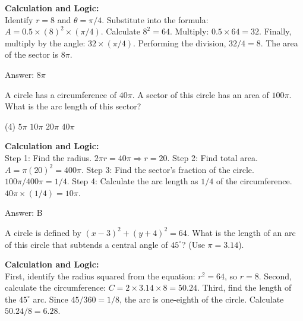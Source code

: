 \documentclass[11pt,paper=a4,answers]{exam}
\begin{document}
\begin{questions}
\begin{solution}
\textbf{Calculation and Logic:} \\
Identify $r = 8$ and $\theta = \pi / 4$. Substitute into the formula: $A = 0.5 \times (8)^2 \times (\pi / 4)$. Calculate $8^2 = 64$. Multiply: $0.5 \times 64 = 32$. Finally, multiply by the angle: $32 \times (\pi / 4)$. Performing the division, $32 / 4 = 8$. The area of the sector is $8\pi$.

\vspace{30pt}

Answer: \colorbox{yellow!100}{$8\pi$}
\end{solution}

\vspace{60pt}

\question
A circle has a circumference of $40\pi$. A sector of this circle has an area of $100\pi$. What is the arc length of this sector?
\begin{tasks}(4)
    \task $5\pi$
    \task $10\pi$
    \task $20\pi$
    \task $40\pi$
\end{tasks}

\begin{solution}
\textbf{Calculation and Logic:} \\
Step 1: Find the radius. $2\pi r = 40\pi \Rightarrow r = 20$. Step 2: Find total area. $A = \pi(20)^2 = 400\pi$. Step 3: Find the sector's fraction of the circle. $100\pi / 400\pi = 1 / 4$. Step 4: Calculate the arc length as $1/4$ of the circumference. $40\pi \times (1/4) = 10\pi$.

\vspace{30pt}

Answer: \colorbox{yellow!100}{B}
\end{solution}

\vspace{60pt}

\question
A circle is defined by $(x-3)^2 + (y+4)^2 = 64$. What is the length of an arc of this circle that subtends a central angle of $45^\circ$? (Use $\pi = 3.14$).

\begin{solution}
\textbf{Calculation and Logic:} \\
First, identify the radius squared from the equation: $r^2 = 64$, so $r = 8$. Second, calculate the circumference: $C = 2 \times 3.14 \times 8 = 50.24$. Third, find the length of the $45^\circ$ arc. Since $45 / 360 = 1 / 8$, the arc is one-eighth of the circle. Calculate $50.24 / 8 = 6.28$.


\end{solution}
\end{questions}
\end{document}
